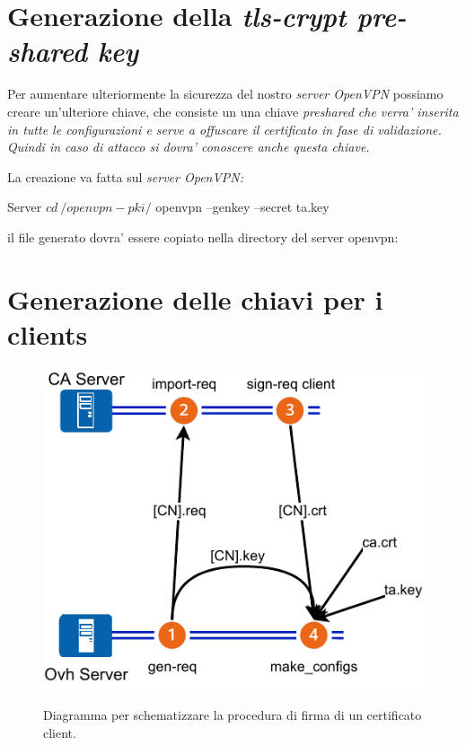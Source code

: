 \section{Generazione della \textit{tls-crypt pre-shared key}}
\label{sec:tls-crypt}

Per aumentare ulteriormente la sicurezza del nostro \textit{server OpenVPN} possiamo creare un'ulteriore chiave, che consiste un una chiave \it{preshared} che verra' inserita in tutte le configurazioni e serve a offuscare il certificato in fase di validazione. Quindi in caso di attacco si dovra' conoscere anche questa chiave.

La creazione va fatta sul \it{server OpenVPN}:

\begin{bashcode}{Server}{}
$ cd ~/openvpn-pki/
$ openvpn --genkey --secret ta.key
\end{bashcode}

il file generato  dovra' essere copiato nella directory del server openvpn:



\section{Generazione delle chiavi per i clients}
\label{sec:client_keys}

\begin{figure}[H]
    \centering
    \includegraphics[width=0.6\linewidth]{immagini/diag-firma_certificato_client}
    \label{fig:diag-firma_certificato}
    \caption{Diagramma per schematizzare la procedura di firma di un certificato client. \cite{icons}}
\end{figure}


